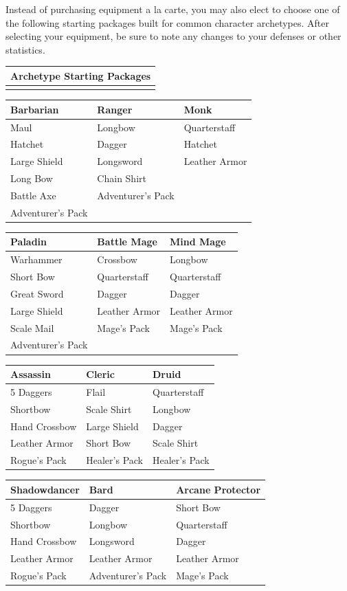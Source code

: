 \documentclass[12pt]{report}
\begin{document}
Instead of purchasing equipment a la carte, you may also elect to choose
one of the following starting packages built for common character
archetypes. After selecting your equipment, be sure to note any changes
to your defenses or other statistics.

\begin{longtable}[c]{@{}l@{}}
\toprule
Archetype Starting Packages\tabularnewline
\midrule
\endhead
\tabularnewline
\bottomrule
\end{longtable}

\begin{longtable}[c]{@{}lll@{}}
\toprule
Barbarian & Ranger & Monk\tabularnewline
\midrule
\endhead
Maul & Longbow & Quarterstaff\tabularnewline
Hatchet & Dagger & Hatchet\tabularnewline
Large Shield & Longsword & Leather Armor\tabularnewline
Long Bow & Chain Shirt &\tabularnewline
Battle Axe & Adventurer's Pack &\tabularnewline
Adventurer's Pack & &\tabularnewline
\bottomrule
\end{longtable}

\begin{longtable}[c]{@{}lll@{}}
\toprule
Paladin & Battle Mage & Mind Mage\tabularnewline
\midrule
\endhead
Warhammer & Crossbow & Longbow\tabularnewline
Short Bow & Quarterstaff & Quarterstaff\tabularnewline
Great Sword & Dagger & Dagger\tabularnewline
Large Shield & Leather Armor & Leather Armor\tabularnewline
Scale Mail & Mage's Pack & Mage's Pack\tabularnewline
Adventurer's Pack & &\tabularnewline
\bottomrule
\end{longtable}

\begin{longtable}[c]{@{}lll@{}}
\toprule
Assassin & Cleric & Druid\tabularnewline
\midrule
\endhead
5 Daggers & Flail & Quarterstaff\tabularnewline
Shortbow & Scale Shirt & Longbow\tabularnewline
Hand Crossbow & Large Shield & Dagger\tabularnewline
Leather Armor & Short Bow & Scale Shirt\tabularnewline
Rogue's Pack & Healer's Pack & Healer's Pack\tabularnewline
\bottomrule
\end{longtable}

\begin{longtable}[c]{@{}lll@{}}
\toprule
Shadowdancer & Bard & Arcane Protector\tabularnewline
\midrule
\endhead
5 Daggers & Dagger & Short Bow\tabularnewline
Shortbow & Longbow & Quarterstaff\tabularnewline
Hand Crossbow & Longsword & Dagger\tabularnewline
Leather Armor & Leather Armor & Leather Armor\tabularnewline
Rogue's Pack & Adventurer's Pack & Mage's Pack\tabularnewline
\bottomrule
\end{longtable}
\end{document}

